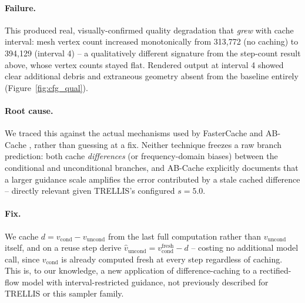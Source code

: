 \documentclass[11pt]{article}
\begin{document}
\paragraph{Failure.} This produced real, visually-confirmed quality degradation that
\emph{grew} with cache interval: mesh vertex count increased monotonically from 313,772 (no
caching) to 394,129 (interval 4) -- a qualitatively different signature from the step-count
result above, whose vertex counts stayed flat. Rendered output at interval 4 showed clear
additional debris and extraneous geometry absent from the baseline entirely
(Figure~\ref{fig:cfg_qual}).

\paragraph{Root cause.} We traced this against the actual mechanisms used by FasterCache
\cite{fastercache} and AB-Cache \cite{abcache}, rather than guessing at a fix. Neither technique
freezes a raw branch prediction: both cache \emph{differences} (or frequency-domain biases)
between the conditional and unconditional branches, and AB-Cache explicitly documents that a
larger guidance scale amplifies the error contributed by a stale cached difference -- directly
relevant given TRELLIS's configured $s = 5.0$.

\paragraph{Fix.} We cache $d = v_{\mathrm{cond}} - v_{\mathrm{uncond}}$ from the last full
computation rather than $v_{\mathrm{uncond}}$ itself, and on a reuse step derive
$\hat{v}_{\mathrm{uncond}} = v_{\mathrm{cond}}^{\mathrm{fresh}} - d$ -- costing no additional model
call, since $v_{\mathrm{cond}}$ is already computed fresh at every step regardless of caching.
This is, to our knowledge, a new application of difference-caching to a rectified-flow model with
interval-restricted guidance, not previously described for TRELLIS or this sampler family.
\end{document}
